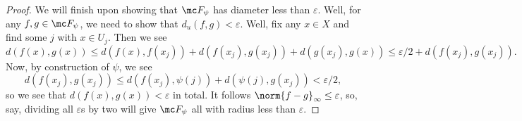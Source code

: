 \documentclass[../notes.tex]{subfiles}
\begin{document}
\begin{proof}
	We will finish upon showing that $\mc F_\psi$ has diameter less than $\varepsilon$. Well, for any $f,g\in\mc F_\psi$, we need to show that $d_u(f,g)<\varepsilon$. Well, fix any $x\in X$ and find some $j$ with $x\in U_j$. Then we see
	\[d(f(x),g(x))\le d(f(x),f(x_j))+d(f(x_j),g(x_j))+d(g(x_j),g(x))\le\varepsilon/2+d(f(x_j),g(x_j)).\]
	Now, by construction of $\psi$, we see
	\[d(f(x_j),g(x_j))\le d(f(x_j),\psi(j))+d(\psi(j),g(x_j))<\varepsilon/2,\]
	so we see that $d(f(x),g(x))<\varepsilon$ in total. It follows $\norm{f-g}_\infty\le\varepsilon$, so, say, dividing all $\varepsilon$s by two will give $\mc F_\psi$ all with radius less than $\varepsilon$.
\end{proof}
\end{document}
